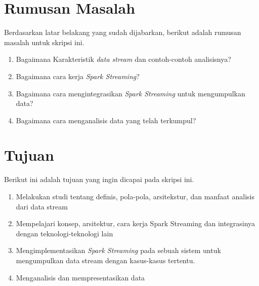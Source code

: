 \documentclass[a4paper,twoside]{article}
\begin{document}
\section{Rumusan Masalah}
Berdasarkan latar belakang yang sudah dijabarkan, berikut adalah rumusan masalah untuk skripsi ini.
\begin{enumerate}
	\item Bagaimana Karakteristik \textit{data stream} dan contoh-contoh analisisnya?
	\item Bagaimana cara kerja \textit{Spark Streaming}?
	\item Bagaimana cara mengintegrasikan \textit{Spark Streaming} untuk mengumpulkan data?
	\item Bagaimana cara menganalisis data yang telah terkumpul?
\end{enumerate}

\section{Tujuan}
Berikut ini adalah tujuan yang ingin dicapai pada skripsi ini.
\begin{enumerate}
\item Melakukan studi tentang definis, pola-pola, arsitekstur, dan manfaat analisis dari data stream
\item Mempelajari konsep, arsitektur, cara kerja Spark Streaming dan integrasinya dengan teknologi-teknologi lain
\item Mengimplementasikan \textit{Spark Streaming} pada sebuah sistem untuk mengumpulkan data stream dengan kasus-kasus tertentu.
\item Menganalisis dan mempresentasikan data 
\end{enumerate}
\end{document}
